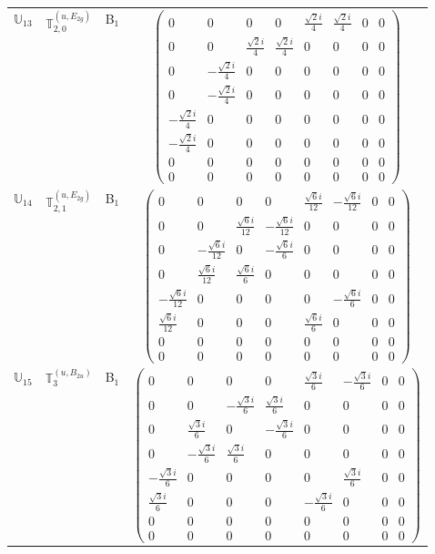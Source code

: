 \documentclass[fleqn,10pt,landscape]{article}
\begin{document}
\begin{itemize}
\begin{center}
\begin{longtable}{c|c|c|c}
$ \mathbb{U}_{13} $ & $\mathbb{T}_{2,0}^{(u,E_{2g})}$ & B$_{1}$ & $\begin{pmatrix} 0 & 0 & 0 & 0 & \frac{\sqrt{2} i}{4} & \frac{\sqrt{2} i}{4} & 0 & 0 \\ 0 & 0 & \frac{\sqrt{2} i}{4} & \frac{\sqrt{2} i}{4} & 0 & 0 & 0 & 0 \\ 0 & - \frac{\sqrt{2} i}{4} & 0 & 0 & 0 & 0 & 0 & 0 \\ 0 & - \frac{\sqrt{2} i}{4} & 0 & 0 & 0 & 0 & 0 & 0 \\ - \frac{\sqrt{2} i}{4} & 0 & 0 & 0 & 0 & 0 & 0 & 0 \\ - \frac{\sqrt{2} i}{4} & 0 & 0 & 0 & 0 & 0 & 0 & 0 \\ 0 & 0 & 0 & 0 & 0 & 0 & 0 & 0 \\ 0 & 0 & 0 & 0 & 0 & 0 & 0 & 0 \end{pmatrix}$ \\
$ \mathbb{U}_{14} $ & $\mathbb{T}_{2,1}^{(u,E_{2g})}$ & B$_{1}$ & $\begin{pmatrix} 0 & 0 & 0 & 0 & \frac{\sqrt{6} i}{12} & - \frac{\sqrt{6} i}{12} & 0 & 0 \\ 0 & 0 & \frac{\sqrt{6} i}{12} & - \frac{\sqrt{6} i}{12} & 0 & 0 & 0 & 0 \\ 0 & - \frac{\sqrt{6} i}{12} & 0 & - \frac{\sqrt{6} i}{6} & 0 & 0 & 0 & 0 \\ 0 & \frac{\sqrt{6} i}{12} & \frac{\sqrt{6} i}{6} & 0 & 0 & 0 & 0 & 0 \\ - \frac{\sqrt{6} i}{12} & 0 & 0 & 0 & 0 & - \frac{\sqrt{6} i}{6} & 0 & 0 \\ \frac{\sqrt{6} i}{12} & 0 & 0 & 0 & \frac{\sqrt{6} i}{6} & 0 & 0 & 0 \\ 0 & 0 & 0 & 0 & 0 & 0 & 0 & 0 \\ 0 & 0 & 0 & 0 & 0 & 0 & 0 & 0 \end{pmatrix}$ \\
$ \mathbb{U}_{15} $ & $\mathbb{T}_{3}^{(u,B_{2u})}$ & B$_{1}$ & $\begin{pmatrix} 0 & 0 & 0 & 0 & \frac{\sqrt{3} i}{6} & - \frac{\sqrt{3} i}{6} & 0 & 0 \\ 0 & 0 & - \frac{\sqrt{3} i}{6} & \frac{\sqrt{3} i}{6} & 0 & 0 & 0 & 0 \\ 0 & \frac{\sqrt{3} i}{6} & 0 & - \frac{\sqrt{3} i}{6} & 0 & 0 & 0 & 0 \\ 0 & - \frac{\sqrt{3} i}{6} & \frac{\sqrt{3} i}{6} & 0 & 0 & 0 & 0 & 0 \\ - \frac{\sqrt{3} i}{6} & 0 & 0 & 0 & 0 & \frac{\sqrt{3} i}{6} & 0 & 0 \\ \frac{\sqrt{3} i}{6} & 0 & 0 & 0 & - \frac{\sqrt{3} i}{6} & 0 & 0 & 0 \\ 0 & 0 & 0 & 0 & 0 & 0 & 0 & 0 \\ 0 & 0 & 0 & 0 & 0 & 0 & 0 & 0 \end{pmatrix}$ \\

\end{longtable}
\end{center}
\end{itemize}
\end{document}

